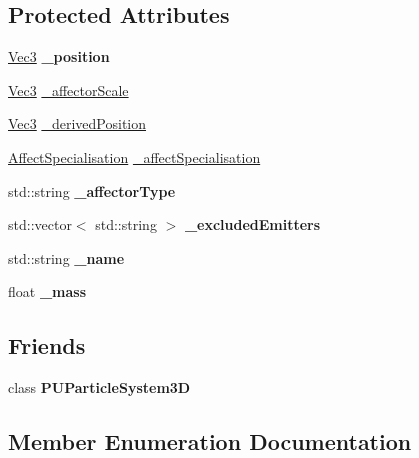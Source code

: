\subsection*{Protected Attributes}
\begin{DoxyCompactItemize}
\item 
\mbox{\label{classPUAffector_a59c7f439bed73ad4923baa8ad409aefa}} 
\hyperlink{classVec3}{Vec3} {\bfseries \+\_\+position}
\item 
\hyperlink{classVec3}{Vec3} \hyperlink{classPUAffector_adfb1e84966fd8173e66499f99cc6c651}{\+\_\+affector\+Scale}
\item 
\hyperlink{classVec3}{Vec3} \hyperlink{classPUAffector_acae485bb9e267d56c2ea498675c93651}{\+\_\+derived\+Position}
\item 
\hyperlink{classPUAffector_aa4e8045ac29ee020895fd3e386935013}{Affect\+Specialisation} \hyperlink{classPUAffector_a961e5931c0c5ad24fed34689fa9fb52d}{\+\_\+affect\+Specialisation}
\item 
\mbox{\label{classPUAffector_a1cb8a1629f3e70f6a3dc07d1b2e7b98c}} 
std\+::string {\bfseries \+\_\+affector\+Type}
\item 
\mbox{\label{classPUAffector_a731b162c8aaee302f9934248f6b46e81}} 
std\+::vector$<$ std\+::string $>$ {\bfseries \+\_\+excluded\+Emitters}
\item 
\mbox{\label{classPUAffector_a7fc520401d08b957cdd98c9cdc661f16}} 
std\+::string {\bfseries \+\_\+name}
\item 
\mbox{\label{classPUAffector_adf3e978a2b05bc2a5cd0f4e70f39b2c3}} 
float {\bfseries \+\_\+mass}
\end{DoxyCompactItemize}
\subsection*{Friends}
\begin{DoxyCompactItemize}
\item 
\mbox{\label{classPUAffector_a6facc234295c573636e9e1f78b0777c8}} 
class {\bfseries P\+U\+Particle\+System3D}
\end{DoxyCompactItemize}


\subsection{Member Enumeration Documentation}
\mbox{\label{classPUAffector_aa4e8045ac29ee020895fd3e386935013}} 
